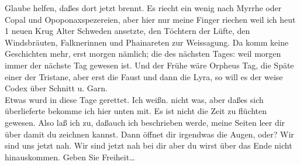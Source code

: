 \documentclass[
]{article}
\begin{document}
Glaube helfen, daßes dort jetzt brennt. Es riecht ein wenig nach Myrrhe
oder Copal und Opoponaxspezereien, aber hier nur meine Finger riechen
weil ich heut 1 neuen Krug Alter Schweden ansetzte, den Töchtern der
Lüfte, den Windsbräuten, Falknerinnen und Phainareten zur Weissagung. Da
komm keine Geschichten mehr, erst morgen nämlich; die des nächsten
Tages: weil morgen immer der nächste Tag gewesen ist. Und der Frühe wäre
Orpheus Tag, die Späte einer der Tristane, aber erst die Faust und dann
die Lyra, so will es der weise Codex über Schnitt u. Garn.\\
Etwas wurd in diese Tage gerettet. Ich weißn. nicht was, aber daßes sich
überlieferte bekomme ich hier unten mit. Es ist nicht die Zeit zu
flüchten gewesen. Also laß ich zu, daßauch ich beschrieben werde, meine
Seiten leer dir über damit du zeichnen kannst. Dann öffnet dir irgendwas
die Augen, oder? Wir sind uns jetzt nah. Wir sind jetzt nah bei dir aber
du wirst über das Ende nicht hinauskommen. Geben Sie Freiheit\ldots{}
\end{document}

